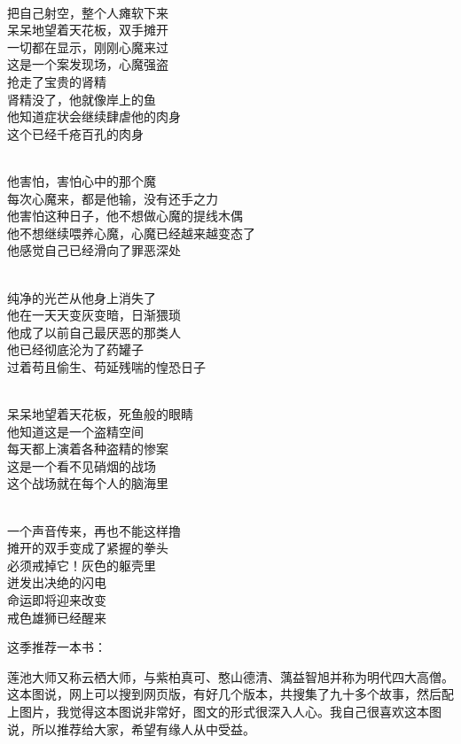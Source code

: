 \begin{poem}[盗精空间]
    \begin{multicols}{2}
        \begin{center}~\\
            把自己射空，整个人瘫软下来 \\ 呆呆地望着天花板，双手摊开 \\ 一切都在显示，刚刚心魔来过 \\ 这是一个案发现场，心魔强盗 \\ 抢走了宝贵的肾精 \\ 肾精没了，他就像岸上的鱼 \\ 他知道症状会继续肆虐他的肉身 \\ 这个已经千疮百孔的肉身

            ~\\

            他害怕，害怕心中的那个魔 \\ 每次心魔来，都是他输，没有还手之力 \\ 他害怕这种日子，他不想做心魔的提线木偶 \\ 他不想继续喂养心魔，心魔已经越来越变态了 \\ 他感觉自己已经滑向了罪恶深处

            ~\\

            纯净的光芒从他身上消失了 \\ 他在一天天变灰变暗，日渐猥琐 \\ 他成了以前自己最厌恶的那类人 \\ 他已经彻底沦为了药罐子 \\ 过着苟且偷生、苟延残喘的惶恐日子

            ~\\

            呆呆地望着天花板，死鱼般的眼睛 \\ 他知道这是一个盗精空间 \\ 每天都上演着各种盗精的惨案 \\ 这是一个看不见硝烟的战场 \\ 这个战场就在每个人的脑海里

            ~\\

            一个声音传来，再也不能这样撸 \\ 摊开的双手变成了紧握的拳头 \\ 必须戒掉它！灰色的躯壳里 \\ 迸发出决绝的闪电 \\ 命运即将迎来改变 \\ 戒色雄狮已经醒来
        \end{center}
    \end{multicols}
\end{poem}

这季推荐一本书：

\begin{book}[《莲池大师戒杀放生文图说》]
    莲池大师又称云栖大师，与紫柏真可、憨山德清、蕅益智旭并称为明代四大高僧。这本图说，网上可以搜到网页版，有好几个版本，共搜集了九十多个故事，然后配上图片，我觉得这本图说非常好，图文的形式很深入人心。我自己很喜欢这本图说，所以推荐给大家，希望有缘人从中受益。
\end{book}
